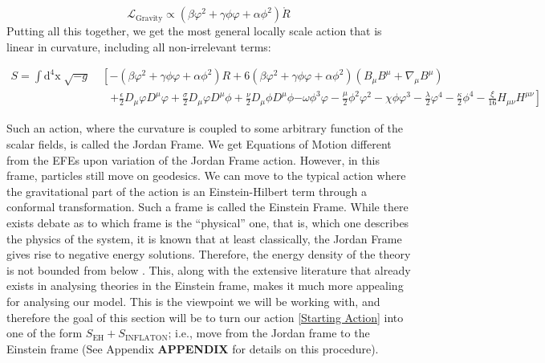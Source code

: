 \documentclass[aps,prd,reprint,preprintnumbers,showpacs,floatfix,nofootinbib,superscript address]{revtex4-2}
\begin{document}
\[
    \mathcal{L}_\text{Gravity} \propto ( \beta \varphi^2 + \gamma \phi \varphi +\alpha \phi^2) \mathring{R}
\]
Putting all this together, we get the most general locally scale action that is linear in curvature, including all non-irrelevant terms:
\begin{widetext} 
    \begin{equations} 
    \begin{align}  \label{Starting Action} 
        S =\int \text{d}^4\text{x} \; \sqrt{-g} &\; \left[ -( \beta \varphi^2 + \gamma \phi \varphi +\alpha \phi^2) R + 6( \beta \varphi^2 + \gamma \phi \varphi +\alpha \phi^2) (B_{\mu} B^{\mu} + \nabla_\mu B^\mu) \right. \nonumber \\
        &\quad \left. +\frac{\epsilon}{2} D_{\mu}\varphi D^{\mu}\varphi + \frac{\sigma}{2} D_{\mu}\varphi D^{\mu}\phi + \frac{\nu}{2} D_{\mu}\phi D^{\mu}\phi \right. \left. - \omega \phi^3 \varphi - \frac{\mu}{2} \phi^2 \varphi^2  - \chi \phi \varphi^3 - \frac{\lambda}{2} \varphi^4 - \frac{\kappa}{2} \phi^4 - \frac{\xi}{16} H_{\mu\nu}H^{\mu\nu} \right]  
    \end{align}
    \end{equations}
\end{widetext}
Such an action, where the curvature is coupled to some arbitrary function of the scalar fields, is called the Jordan Frame. We get Equations of Motion different from the EFEs upon variation of the Jordan Frame action. However, in this frame, particles still move on geodesics. We can move to the typical action where the gravitational part of the action is an Einstein-Hilbert term through a conformal transformation. Such a frame is called the Einstein Frame. While there exists debate as to which frame is the ``physical'' one, that is, which one describes the physics of the system, it is known that at least classically, the Jordan Frame gives rise to negative energy solutions. Therefore, the energy density of the theory is not bounded from below \cite{faraoni_einstein_1999, faraoni_conformal_1998, magnano_physical_1994}. This, along with the extensive literature that already exists in analysing theories in the Einstein frame, makes it much more appealing for analysing our model. This is the viewpoint we will be working with, and therefore the goal of this section will be to turn our action \ref{Starting Action} into one of the form $S_{\text{EH}} + S_{\text{INFLATON}}$; i.e., move from the Jordan frame to the Einstein frame (See Appendix \textbf{APPENDIX} for details on this procedure). 
\end{document}
